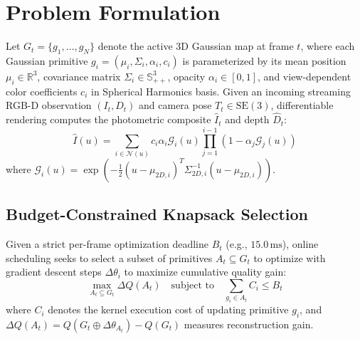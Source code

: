 \documentclass[10pt,twocolumn,letterpaper]{article}
\begin{document}
\section{Problem Formulation}
Let $G_t = \{g_1, \dots, g_N\}$ denote the active 3D Gaussian map at frame $t$, where each Gaussian primitive $g_i = (\mu_i, \Sigma_i, \alpha_i, c_i)$ is parameterized by its mean position $\mu_i \in \mathbb{R}^3$, covariance matrix $\Sigma_i \in \mathbb{S}_{++}^3$, opacity $\alpha_i \in [0, 1]$, and view-dependent color coefficients $c_i$ in Spherical Harmonics basis.
Given an incoming streaming RGB-D observation $(I_t, D_t)$ and camera pose $T_t \in \mathrm{SE}(3)$, differentiable rendering computes the photometric composite $\hat{I}_t$ and depth $\hat{D}_t$:
\begin{equation}
\hat{I}(u) = \sum_{i \in \mathcal{N}(u)} c_i \alpha_i \mathcal{G}_i(u) \prod_{j=1}^{i-1} (1 - \alpha_j \mathcal{G}_j(u))
\end{equation}
where $\mathcal{G}_i(u) = \exp(-\frac{1}{2}(u - \mu_{2D, i})^T \Sigma_{2D, i}^{-1}(u - \mu_{2D, i}))$.

\subsection{Budget-Constrained Knapsack Selection}
Given a strict per-frame optimization deadline $B_t$ (e.g., $15.0\,\mathrm{ms}$), online scheduling seeks to select a subset of primitives $A_t \subseteq G_t$ to optimize with gradient descent steps $\Delta \theta_i$ to maximize cumulative quality gain:
\begin{equation}
\max_{A_t \subseteq G_t} \Delta Q(A_t) \quad \text{subject to} \quad \sum_{g_i \in A_t} C_i \le B_t
\end{equation}
where $C_i$ denotes the kernel execution cost of updating primitive $g_i$, and $\Delta Q(A_t) = Q(G_t \oplus \Delta \theta_{A_t}) - Q(G_t)$ measures reconstruction gain.
\end{document}
